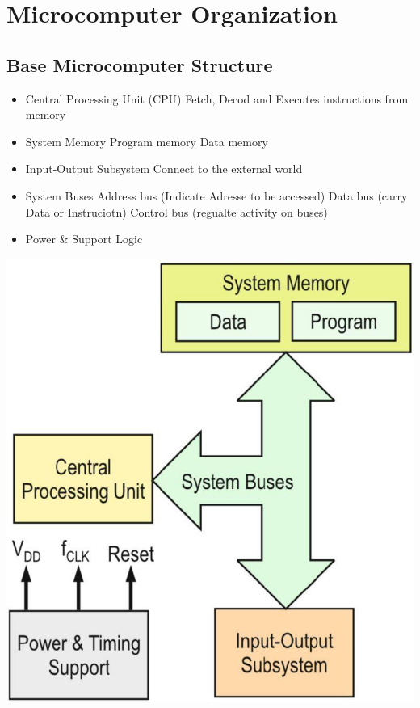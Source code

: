 \section{Microcomputer Organization } 
\subsection{Base Microcomputer Structure }
\begin{minipage}{0.7\linewidth}
	\begin{itemize}
		\item Central Processing Unit (CPU)
		\subitem Fetch, Decod and Executes instructions from memory
		\item System Memory
		\subitem Program memory
		\subitem Data memory 
		\item Input-Output Subsystem
		\subitem Connect to the external world
		\item System Buses 
		\subitem Address bus (Indicate Adresse to be accessed)
		\subitem Data bus (carry Data or Instruciotn)
		\subitem Control bus (regualte activity on buses)
		\item Power \& Support Logic
	\end{itemize}
\end{minipage}
\begin{minipage}{0.3\linewidth}
	\includegraphics[width=0.8\linewidth]{images/uCArchitecture} 
\end{minipage}
